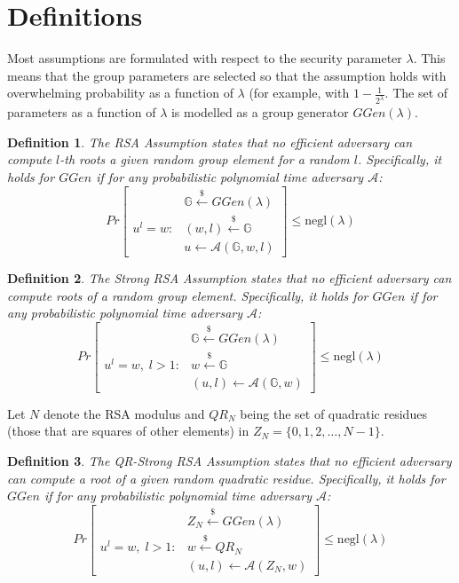 \documentclass[a4paper]{article}
\newtheorem{definition}{Definition}
\begin{document}
\section{Definitions}

Most assumptions are formulated with respect to the security parameter $\lambda$. This means that the group parameters are selected so that the assumption holds with overwhelming probability as a function of $\lambda$ (for example, with $1-\frac{1}{2^{\lambda}}$. The set of parameters as a function of $\lambda$ is modelled as a group generator $GGen(\lambda)$.

\begin{definition}
The \emph{RSA Assumption} states that no
efficient adversary can compute $l$-th roots a given random group element for a random $l$. Specifically,
it holds for $GGen$ if for any probabilistic polynomial time adversary $\mathcal{A}$:
$$
Pr
\begin{bmatrix}
&\mathbb{G}\xleftarrow{\$}GGen(\lambda)\\
u^l = w :
& (w,l)\xleftarrow{\$}\mathbb{G}\\
&u \xleftarrow{} \mathcal{A}(\mathbb{G},w,l)
\end{bmatrix}\leq \mathrm{negl}(\lambda)
$$
\end{definition}

\begin{definition}
The \emph{Strong RSA Assumption} states that no
efficient adversary can compute roots of a random group element. Specifically,
it holds for $GGen$ if for any probabilistic polynomial time adversary $\mathcal{A}$:
$$
Pr
\begin{bmatrix}
&\mathbb{G}\xleftarrow{\$}GGen(\lambda)\\
u^l = w,\; l>1 :
& w\xleftarrow{\$}\mathbb{G}\\
&(u,l) \xleftarrow{} \mathcal{A}(\mathbb{G},w)
\end{bmatrix}\leq \mathrm{negl}(\lambda)
$$
\end{definition}

Let $N$ denote the RSA modulus and $QR_N$ being the set of quadratic residues (those that are squares of other elements) in $Z_N = \{0,1,2,\ldots,N-1\}$.
\begin{definition}
The \emph{QR-Strong RSA Assumption} states that no 
efficient adversary can compute a root of a given random quadratic residue. Specifically,
it holds for $GGen$ if for any probabilistic polynomial time adversary $\mathcal{A}$:
$$
Pr
\begin{bmatrix}
&Z_N\xleftarrow{\$}GGen(\lambda)\\
u^l = w,\; l>1 :
& w\xleftarrow{\$}QR_N\\
&(u,l) \xleftarrow{} \mathcal{A}(Z_N,w)
\end{bmatrix}\leq \mathrm{negl}(\lambda)
$$
\end{definition}
\end{document}
